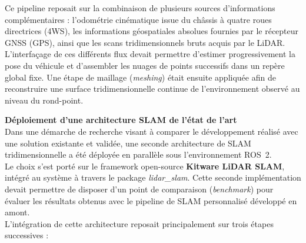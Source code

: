 \documentclass[12pt,a4paper,oneside]{report}
\begin{document}
\hspace*{.3cm}Ce pipeline reposait sur la combinaison de plusieurs sources d'informations complémentaires : l'odométrie cinématique issue du châssis à quatre roues directrices (4WS), les informations géospatiales absolues fournies par le récepteur GNSS (GPS), ainsi que les scans tridimensionnels bruts acquis par le LiDAR.\\

\hspace*{.3cm}L'interfaçage de ces différents flux devait permettre d'estimer progressivement la pose du véhicule et d'assembler les nuages de points successifs dans un repère global fixe. Une étape de maillage (\textit{meshing}) était ensuite appliquée afin de reconstruire une surface tridimensionnelle continue de l'environnement observé au niveau du rond-point.

\par\bigskip
\par\bigskip

\hspace*{0.4cm}\textbf{Déploiement d'une architecture SLAM de l'état de l'art}\\

\hspace*{.3cm}Dans une démarche de recherche visant à comparer le développement réalisé avec une solution existante et validée, une seconde architecture de SLAM tridimensionnelle a été déployée en parallèle sous l'environnement ROS~2.\\

\hspace*{.3cm}Le choix s'est porté sur le framework open-source \textbf{Kitware LiDAR SLAM}, intégré au système à travers le package \textit{lidar\_slam}. Cette seconde implémentation devait permettre de disposer d'un point de comparaison (\textit{benchmark}) pour évaluer les résultats obtenus avec le pipeline de SLAM personnalisé développé en amont.\\

\hspace*{.3cm}L'intégration de cette architecture reposait principalement sur trois étapes successives :
\end{document}
